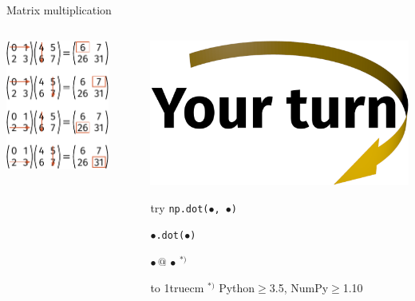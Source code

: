 \documentclass[svgnames]{beamer}
\begin{document}
\begin{frame}[fragile]{Matrix multiplication}
 \begin{columns}
  \begin{column}{0.6\textwidth}
   \begin{center}
    \includegraphics[width=0.8\textwidth]{matrixmult}
   \end{center}
  \end{column}%
  \begin{column}{0.4\textwidth}
   \includegraphics[width=3truecm]{yourturn}

   \vspace{0.4truecm}
   try \texttt{np.dot($\bullet$, $\bullet$)}\\
   \strut\hphantom{try\ }\texttt{$\bullet$.dot($\bullet$)}\\
   \strut\hphantom{try\ }\texttt{$\bullet\,@\,\bullet$}\,$^{*)}$
   
   \vspace{0.7truecm}
   \hbox to 1truecm{\hrulefill}
   \scriptsize{$^{*)}$ Python$\geq$3.5, NumPy$\geq$1.10}
   \vspace{1truecm}
  \end{column}
 \end{columns}
\end{frame}
\end{document}

